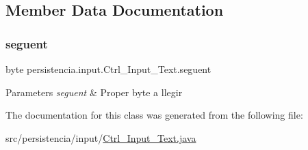 \subsection{Member Data Documentation}
\mbox{\label{classpersistencia_1_1input_1_1Ctrl__Input__Text_a533e9e0497774114b57d8dd5a6bbb000}} 
\subsubsection{\texorpdfstring{seguent}{seguent}}
{\footnotesize\ttfamily byte persistencia.\+input.\+Ctrl\+\_\+\+Input\+\_\+\+Text.\+seguent\hspace{0.3cm}{\ttfamily [package]}}


\begin{DoxyParams}{Parameters}
{\em seguent} & Proper byte a llegir \\
\hline
\end{DoxyParams}


The documentation for this class was generated from the following file\+:\begin{DoxyCompactItemize}
\item 
src/persistencia/input/\hyperlink{Ctrl__Input__Text_8java}{Ctrl\+\_\+\+Input\+\_\+\+Text.\+java}\end{DoxyCompactItemize}
